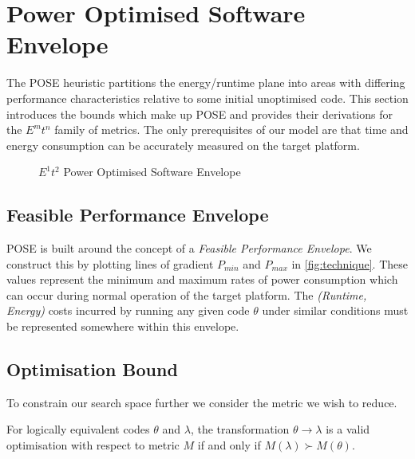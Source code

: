 \section{Power Optimised Software Envelope}
\label{sec:pose}
\noindent
The POSE heuristic partitions the energy/runtime plane into areas with differing performance characteristics relative to some initial unoptimised code.
This section introduces the bounds which make up POSE and provides their derivations for the $E^mt^n$ family of metrics.
The only prerequisites of our model are that time and energy consumption can be accurately measured on the target platform.

\begin{figure}
\centering

\caption{$E^1t^2$ Power Optimised Software Envelope}
\label{fig:technique}
\end{figure}

\subsection{Feasible Performance Envelope}
\noindent
POSE is built around the concept of a \emph{Feasible Performance Envelope}.
We construct this by plotting lines of gradient $P_{min}$ and $P_{max}$ in \autoref{fig:technique}.
These values represent the minimum and maximum rates of power consumption which can occur during normal operation of the target platform.
The \textit{(Runtime, Energy)} costs incurred by running any given code $\theta$ under similar conditions must be represented somewhere within this envelope.

\subsection{Optimisation Bound}
\noindent
To constrain our search space further we consider the metric we wish to reduce.

\vspace{5mm}
\begin{definition}
For logically equivalent codes $\theta$ and $\lambda$, the transformation ${\theta \to \lambda}$ is a valid optimisation with respect to metric $M$ if and only if ${M(\lambda) \succ M(\theta)}$.
\label{def:optimisation}
\end{definition}
\vspace{5mm}

